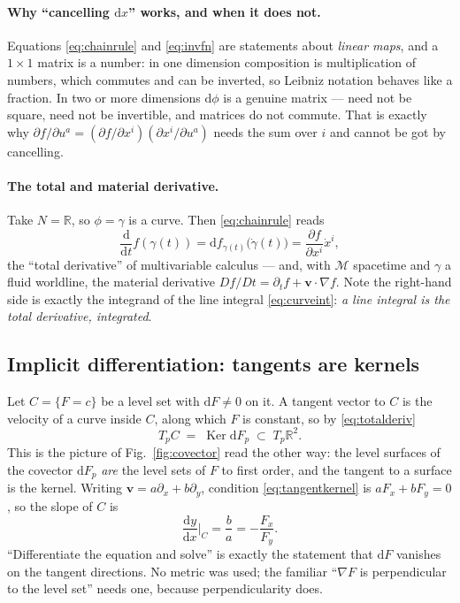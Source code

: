 \documentclass[10pt,a4paper]{article}
\newcommand{\dd}{\mathrm{d}}
\newcommand{\R}{\mathbb{R}}
\newcommand{\M}{\mathcal{M}}
\newcommand{\pd}[2]{\frac{\partial #1}{\partial #2}}
\newcommand{\vv}{\mathbf{v}}
\newcommand{\Ker}{\operatorname{Ker}}
\theoremstyle{plain}
\theoremstyle{definition}
\numberwithin{equation}{section}
\begin{document}
\paragraph{Why ``cancelling $\dd x$'' works, and when it does not.} Equations
\eqref{eq:chainrule} and \eqref{eq:invfn} are statements about \emph{linear maps}, and a
$1\times1$ matrix is a number: in one dimension composition is multiplication of numbers, which
commutes and can be inverted, so Leibniz notation behaves like a fraction. In two or more
dimensions $\dd\phi$ is a genuine matrix --- need not be square, need not be invertible, and
matrices do not commute. That is exactly why
$\partial f/\partial u^a=(\partial f/\partial x^i)(\partial x^i/\partial u^a)$ needs the sum
over $i$ and cannot be got by cancelling.

\paragraph{The total and material derivative.} Take $N=\R$, so $\phi=\gamma$ is a curve. Then
\eqref{eq:chainrule} reads
\begin{equation}
\frac{\dd}{\dd t}f(\gamma(t))=\dd f_{\gamma(t)}\big(\dot\gamma(t)\big)=\pd{f}{x^i}\dot x^i ,
\label{eq:totalderiv}
\end{equation}
the ``total derivative'' of multivariable calculus --- and, with $\M$ spacetime and $\gamma$ a
fluid worldline, the material derivative $Df/Dt=\partial_tf+\vv\cdot\nabla f$. Note the
right-hand side is exactly the integrand of the line integral \eqref{eq:curveint}: \emph{a line
integral is the total derivative, integrated}.

\subsection{Implicit differentiation: tangents are kernels}
\label{sec:implicit}

Let $C=\{F=c\}$ be a level set with $\dd F\ne0$ on it. A tangent vector to $C$ is the velocity
of a curve inside $C$, along which $F$ is constant, so by \eqref{eq:totalderiv}
\begin{equation}
T_pC\;=\;\Ker\dd F_p\;\subset\;T_p\R^2 .
\label{eq:tangentkernel}
\end{equation}
This is the picture of Fig.~\ref{fig:covector} read the other way: the level surfaces of the
covector $\dd F_p$ \emph{are} the level sets of $F$ to first order, and the tangent to a surface
is the kernel. Writing $\vv=a\partial_x+b\partial_y$, condition \eqref{eq:tangentkernel} is
$aF_x+bF_y=0$, so the slope of $C$ is
\begin{equation}
\frac{\dd y}{\dd x}\bigg|_C=\frac ba=-\frac{F_x}{F_y}.
\end{equation}
``Differentiate the equation and solve'' is exactly the statement that $\dd F$ vanishes on the
tangent directions. No metric was used; the familiar ``$\nabla F$ is perpendicular to the level set''
needs one, because perpendicularity does.
\end{document}
